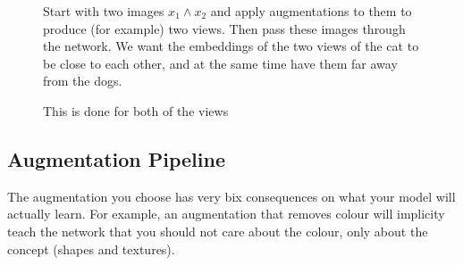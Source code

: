 \documentclass[11pt]{article}
\begin{document}
\begin{figure}[H]
    \centering
    \caption*{Start with two images $x_1 \wedge x_2$ and apply augmentations to them to produce (for example) two views. Then pass these images through the network. We want the embeddings of the two views of the cat to be close to each other, and at the same time have them far away from the dogs.}
\end{figure}

\begin{figure}[H]
    \centering
    \caption*{This is done for both of the views}
\end{figure}

\subsection{Augmentation Pipeline}

The augmentation you choose has very bix consequences on what your model will actually learn. For example, an augmentation that removes colour will implicity teach the network that you should not care about the colour, only about the concept (shapes and textures).
\end{document}
